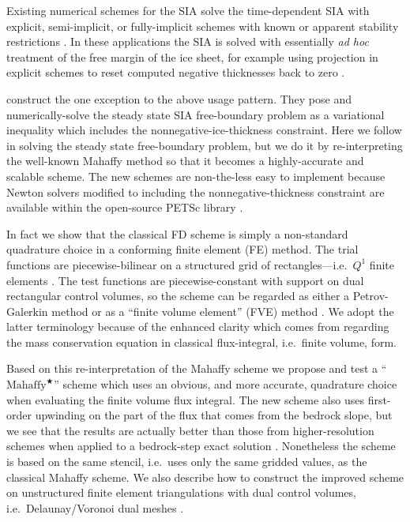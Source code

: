 \documentclass[twocolumn]{igs}
\newcommand{\Mstar}{$\text{Mahaffy}^{\bigstar}$\xspace}
\begin{document}
Existing numerical schemes for the SIA solve the time-dependent SIA with explicit, semi-implicit, or fully-implicit schemes with known or apparent stability restrictions \citep[among others]{Bueleretal2005,EgholmNielsen2010,HindmarshPayne1996,Huybrechtsetal1996,
JaroschSchoofAnslow2013}.  In these applications the SIA is solved with essentially \emph{ad hoc} treatment of the free margin of the ice sheet, for example using projection in explicit schemes to reset computed negative thicknesses back to zero \citep{Bueleretal2005,JaroschSchoofAnslow2013}.

\cite{JouvetBueler2012} construct the one exception to the above usage pattern.  They pose and numerically-solve the steady state SIA free-boundary problem as a variational inequality \citep{KinderlehrerStampacchia} which includes the nonnegative-ice-thickness constraint.  Here we follow \cite{JouvetBueler2012} in solving the steady state free-boundary problem, but we do it by re-interpreting the well-known Mahaffy method so that it becomes a highly-accurate and scalable scheme.  The new schemes are non-the-less easy to implement because Newton solvers modified to including the nonnegative-thickness constraint \citep{BensonMunson2006} are available within the open-source PETSc library \citep{Balayetal2014}.

In fact we show that the classical \cite{Mahaffy1976} FD scheme is simply a non-standard quadrature choice in a conforming finite element (FE) method.  The trial functions are piecewise-bilinear on a structured grid of rectangles---i.e.~$Q^1$ finite elements \citep{Elmanetal2005}.  The test functions are piecewise-constant with support on dual rectangular control volumes, so the scheme can be regarded as either a Petrov-Galerkin method \citep{Elmanetal2005} or as a ``finite volume element'' (FVE) method \citep{Cai1990,EwingLinLin2002}.  We adopt the latter terminology because of the enhanced clarity which comes from regarding the mass conservation equation in classical flux-integral, i.e.~finite volume, form.

Based on this re-interpretation of the Mahaffy scheme we propose and test a ``\Mstar'' scheme which uses an obvious, and more accurate, quadrature choice when evaluating the finite volume flux integral.  The new scheme also uses first-order upwinding on the part of the flux that comes from the bedrock slope, but we see that the results are actually better than those from higher-resolution schemes when applied to a bedrock-step exact solution \citep{JaroschSchoofAnslow2013}.  Nonetheless the scheme is based on the same stencil, i.e.~uses only the same gridded values, as the classical Mahaffy scheme.  We also describe how to construct the improved scheme on unstructured finite element triangulations with dual control volumes, i.e.~Delaunay/Voronoi dual meshes \citep{EgholmNielsen2010,Ringleretal2013}.
\end{document}
